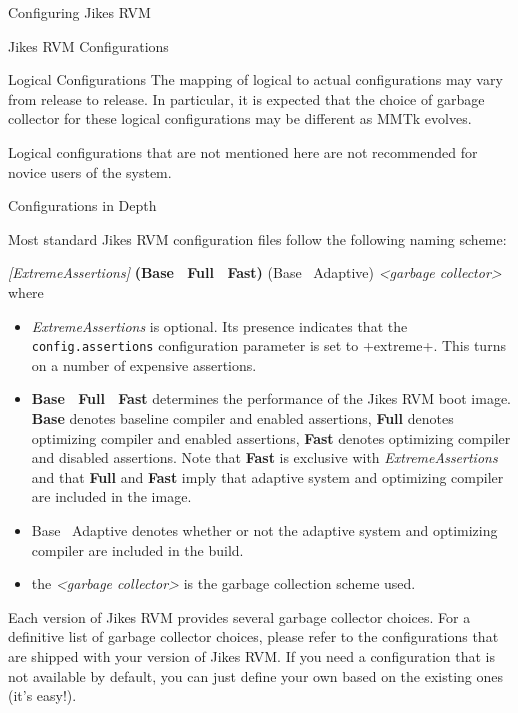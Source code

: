 \begin{chapter}{Configuring Jikes RVM}
\begin{section}{Jikes RVM Configurations}
\begin{subsection}{Logical Configurations}
The mapping of logical to actual configurations may vary from release to release. In particular, it is expected that the choice of garbage collector for these logical configurations may be different as MMTk evolves.

Logical configurations that are not mentioned here are not recommended for novice users of the system.

\end{subsection}

\begin{subsection}{Configurations in Depth}

Most standard Jikes RVM configuration files follow the following naming scheme:

\textit{[ExtremeAssertions]} \textbf{(Base \textbar\ Full \textbar\ Fast)} (Base \textbar\ Adaptive) \textit{\textless garbage collector\textgreater }
where
\begin{itemize}
  \item \textit{ExtremeAssertions} is optional. Its presence indicates that the \texttt{con\-fig.as\-ser\-tions} configuration parameter is set to \spverb+extreme+. This turns on a number of expensive assertions.
  \item \textbf{Base \textbar\ Full \textbar\ Fast} determines the performance of the Jikes RVM boot image. \textbf{Base} denotes baseline compiler and enabled assertions, \textbf{Full} denotes optimizing compiler and enabled assertions, \textbf{Fast} denotes optimizing compiler and disabled assertions. Note that \textbf{Fast} is exclusive with \textit{ExtremeAssertions} and that \textbf{Full} and \textbf{Fast} imply that adaptive system and optimizing compiler are included in the image.
  \item Base \textbar\ Adaptive denotes whether or not the adaptive system and optimizing compiler are included in the build.
  \item the \textit{\textless garbage collector\textgreater} is the garbage collection scheme used.
\end{itemize}

Each version of Jikes RVM provides several garbage collector choices. For a definitive list of garbage collector choices, please refer to the configurations that are shipped with your version of Jikes RVM. If you need a configuration that is not available by default, you can just define your own based on the existing ones (it's easy!).


\end{subsection}
\end{section}
\end{chapter}
